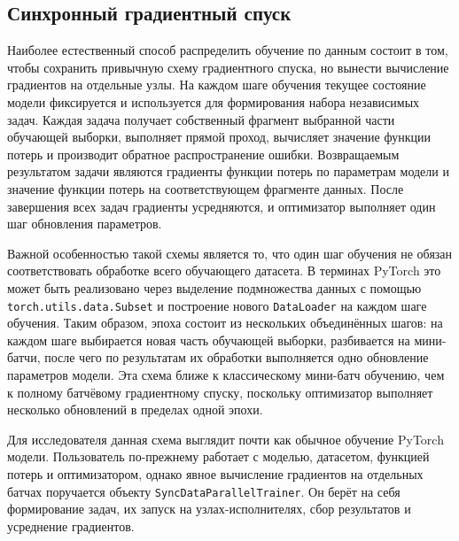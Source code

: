 \documentclass[a4paper,12pt]{extarticle}
\begin{document}
\subsection{Синхронный градиентный спуск}

Наиболее естественный способ распределить обучение по данным состоит в том, чтобы сохранить привычную схему градиентного спуска, но вынести вычисление градиентов на отдельные узлы.
На каждом шаге обучения текущее состояние модели фиксируется и используется для формирования набора независимых задач.
Каждая задача получает собственный фрагмент выбранной части обучающей выборки, выполняет прямой проход, вычисляет значение функции потерь и производит обратное распространение ошибки.
Возвращаемым результатом задачи являются градиенты функции потерь по параметрам модели и значение функции потерь на соответствующем фрагменте данных.
После завершения всех задач градиенты усредняются, и оптимизатор выполняет один шаг обновления параметров.

Важной особенностью такой схемы является то, что один шаг обучения не обязан соответствовать обработке всего обучающего датасета.
В терминах PyTorch это может быть реализовано через выделение подмножества данных с помощью \texttt{torch.utils.data.Subset} и построение нового \texttt{DataLoader} на каждом шаге обучения.
Таким образом, эпоха состоит из нескольких объединённых шагов: на каждом шаге выбирается новая часть обучающей выборки, разбивается на мини-батчи, после чего по результатам их обработки выполняется одно обновление параметров модели.
Эта схема ближе к классическому мини-батч обучению, чем к полному батчёвому градиентному спуску, поскольку оптимизатор выполняет несколько обновлений в пределах одной эпохи.

Для исследователя данная схема выглядит почти как обычное обучение PyTorch модели.
Пользователь по-прежнему работает с моделью, датасетом, функцией потерь и оптимизатором, однако явное вычисление градиентов на отдельных батчах поручается объекту \texttt{SyncDataParallelTrainer}.
Он берёт на себя формирование задач, их запуск на узлах-исполнителях, сбор результатов и усреднение градиентов.
\end{document}
